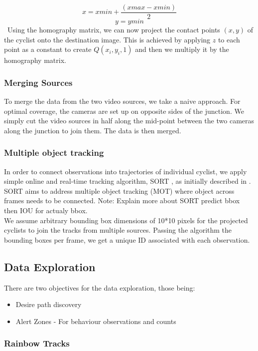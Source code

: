 $$x = xmin + \frac{(xmax - xmin)}{2}$$
$$y = ymin$$
\
Using the homography matrix, we can now project the contact points $(x, y)$ of the cyclist onto the destination
image. This is achieved by applying $z$ to each point as a constant to create $Q(x_i, y_i, 1)$ and then we multiply it by the homography matrix. 

\subsubsection{Merging Sources}

To merge the data from the two video sources, we take a naive approach. For optimal coverage, the cameras are set up on
opposite sides of the junction. We simply cut the video sources in half along the mid-point between
the two cameras along the junction to join them. The data is then merged.

\subsubsection{Multiple object tracking}

In order to connect observations into trajectories of individual cyclist, we apply 
simple online and real-time tracking algorithm, SORT \cite{abewley_abewley/sort_2021}, as initially described in \cite{Bewley2016_sort}. 
SORT aims to address multiple object tracking (MOT) where object across frames needs to be connected. 
\color{red}
Note: Explain more about SORT predict bbox then IOU for actualy bbox.
\color{black}
\ \\
We assume arbitrary bounding box dimensions of 10*10 pixels for the projected cyclists to join the tracks from multiple sources. 
Passing the algorithm the bounding boxes per frame, we get a unique ID associated with each observation.

\subsection{Data Exploration}

There are two objectives for the data exploration, those being:
\begin{itemize}
	\item Desire path discovery
	\item Alert Zones - For behaviour observations and counts
\end{itemize}

\subsubsection{Rainbow Tracks}

